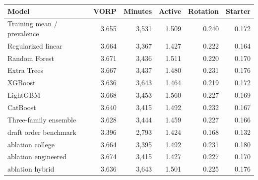 \begin{tabular}{lrrrrr}
\toprule
Model & VORP & Minutes & Active & Rotation & Starter \\
\midrule
Training mean / prevalence & 3.655 & 3,531 & 1.509 & 0.240 & 0.172 \\
Regularized linear & 3.664 & 3,367 & 1.427 & 0.222 & 0.164 \\
Random Forest & 3.671 & 3,436 & 1.511 & 0.220 & 0.170 \\
Extra Trees & 3.667 & 3,437 & 1.480 & 0.231 & 0.176 \\
XGBoost & 3.636 & 3,643 & 1.464 & 0.219 & 0.172 \\
LightGBM & 3.668 & 3,453 & 1.560 & 0.227 & 0.169 \\
CatBoost & 3.640 & 3,415 & 1.492 & 0.232 & 0.167 \\
Three-family ensemble & 3.628 & 3,444 & 1.459 & 0.227 & 0.166 \\
draft order benchmark & 3.396 & 2,793 & 1.424 & 0.168 & 0.132 \\
ablation college & 3.664 & 3,395 & 1.492 & 0.231 & 0.180 \\
ablation engineered & 3.674 & 3,415 & 1.427 & 0.227 & 0.170 \\
ablation hybrid & 3.636 & 3,643 & 1.501 & 0.225 & 0.176 \\
\bottomrule
\end{tabular}